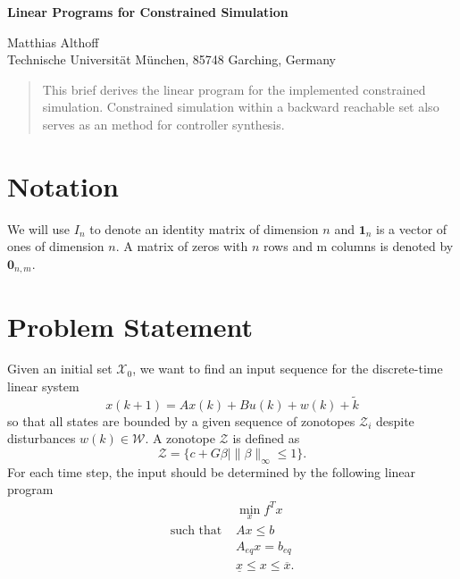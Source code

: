 \documentclass[10pt,a4paper]{article}
\renewcommand{\^}[1]{^{(#1)}}
\begin{document}
\mbox{} \vspace{0.8cm} \mbox{}
\begin{center} {\huge\textbf{Linear Programs for Constrained Simulation}} \end{center}
\vspace{0.2cm}
\begin{center} {\large Matthias Althoff} \\[0.2cm] Technische Universit\"at M\"unchen, 85748 Garching, Germany
\end{center}
\vspace{0.2cm}



\begin{abstract}
 This brief derives the linear program for the implemented constrained simulation. Constrained simulation within a backward reachable set also serves as an method for controller synthesis.
\end{abstract}

\section{Notation}

We will use $I_n$ to denote an identity matrix of dimension $n$ and $\mathbf{1}_n$ is a vector of ones of dimension $n$. A matrix of zeros with $n$ rows and m columns is denoted by $\mathbf{0}_{n,m}$. 


\section{Problem Statement}

Given an initial set $\mathcal{X}_0$, we want to find an input sequence for the discrete-time linear system
\begin{equation} \label{eq:dynamics}
 x(k+1) = A x(k) + B u(k) + w(k) + \tilde{k}
\end{equation}
so that all states are bounded by a given sequence of zonotopes $\mathcal{Z}_i$ despite disturbances $w(k) \in \mathcal{W}$. A zonotope $\mathcal{Z}$ is defined as
\begin{equation*}
 \mathcal{Z} = \{ c + G\beta | \|\beta\|_\infty \leq 1 \}.
\end{equation*}
For each time step, the input should be determined by the following linear program 
\begin{equation} \label{eq:standardForm}
\begin{split}
 & \min_x f^T x \\
 \text{such that } & Ax \leq b \\
 & A_{eq} x = b_{eq} \\
 & \underline{x} \leq x \leq \overline{x}.
\end{split}
\end{equation}
\end{document}

